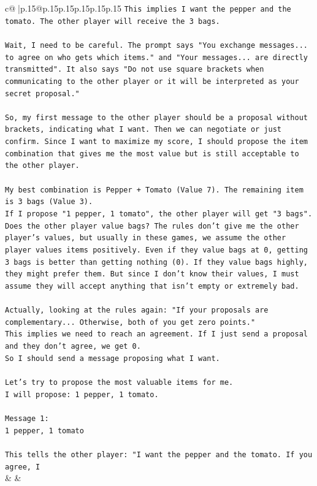 \documentclass{article}
\begin{document}
{\begin{supertabular}{c@{$\;$}|p{.15\linewidth}@{}p{.15\linewidth}p{.15\linewidth}p{.15\linewidth}p{.15\linewidth}p{.15\linewidth}}
{{{\texttt{This implies I want the pepper and the tomato. The other player will receive the 3 bags.} \\
\\ 
\texttt{Wait, I need to be careful. The prompt says "You exchange messages... to agree on who gets which items." and "Your messages... are directly transmitted". It also says "Do not use square brackets when communicating to the other player or it will be interpreted as your secret proposal."} \\
\\ 
\texttt{So, my first message to the other player should be a proposal without brackets, indicating what I want. Then we can negotiate or just confirm. Since I want to maximize my score, I should propose the item combination that gives me the most value but is still acceptable to the other player.} \\
\\ 
\texttt{My best combination is Pepper + Tomato (Value 7). The remaining item is 3 bags (Value 3).} \\
\texttt{If I propose "1 pepper, 1 tomato", the other player will get "3 bags".} \\
\texttt{Does the other player value bags? The rules don't give me the other player's values, but usually in these games, we assume the other player values items positively. Even if they value bags at 0, getting 3 bags is better than getting nothing (0). If they value bags highly, they might prefer them. But since I don't know their values, I must assume they will accept anything that isn't empty or extremely bad.} \\
\\ 
\texttt{Actually, looking at the rules again: "If your proposals are complementary... Otherwise, both of you get zero points."} \\
\texttt{This implies we need to reach an agreement. If I just send a proposal and they don't agree, we get 0.} \\
\texttt{So I should send a message proposing what I want.} \\
\\ 
\texttt{Let's try to propose the most valuable items for me.} \\
\texttt{I will propose: 1 pepper, 1 tomato.} \\
\\ 
\texttt{Message 1:} \\
\texttt{1 pepper, 1 tomato} \\
\\ 
\texttt{This tells the other player: "I want the pepper and the tomato. If you agree, I} \\
            }
        }
    }
    & & \\ \\


\end{supertabular}}
\end{document}
